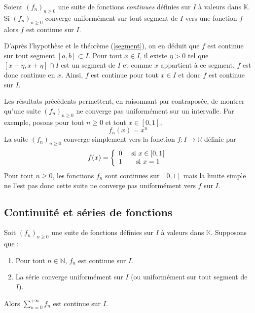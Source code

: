 \documentclass[a4paper,10pt]{report}
\begin{document}
\begin{Proposition}{} Soient $(f_n)_{n \geq 0}$ une suite de fonctions \emph{continues} définies sur $I$ à valeurs dans $\mathbb{K}$. Si $(f_n)_{n \geq 0}$ converge uniformément sur tout segment de $I$ vers une fonction $f$ alors $f$ est continue sur $I$.
\end{Proposition}

\begin{Demonstration}{} D'après l'hypothèse et le théorème (\ref{segment}), on en déduit que $f$ est continue sur tout segment $[a,b] \subset I$. Pour tout $x \in I$, il existe $\eta>0$ tel que $[x- \eta, x+ \eta] \cap I$ est un segment de $I$ et comme $x$ appartient à ce segment, $f$ est donc continue en $x$. Ainsi, $f$ est continue pour tout $x \in I$ et donc $f$ est continue sur $I$.
\end{Demonstration}

\medskip



\begin{Remarque}{} Les résultats précédents permettent, en raisonnant par contraposée, de montrer qu'une suite $(f_n)_{n \geq 0}$ ne converge pas uniformément sur un intervalle. Par exemple, posons pour tout $n \geq 0$ et tout $x \in [0,1]$,
$$ f_n(x) = x^n $$
La suite $(f_n)_{n \geq 0}$ converge simplement vers la fonction $f : I \rightarrow \mathbb{R}$ définie par 
$$  f(x) = \left\lbrace \begin{array}{ccl}
0 & \hbox{ si } x \in [0,1[ \\
1 & \hbox{ si } x =1 \\
\end{array}\right. $$
Pour tout $n \geq 0$, les fonctions $f_n$ sont continues sur $[0,1]$ mais la limite simple ne l'est pas donc cette suite ne converge pas uniformément vers $f$ sur $I$.
\end{Remarque}

\subsection{Continuité et séries de fonctions}

\begin{Theoreme}{} Soit $(f_n)_{n \geq 0}$ une suite de fonctions définies sur $I$ à valeurs dans $\mathbb{K}$. Supposons que :

\begin{enumerate}
\item Pour tout $n \in \mathbb{N}$, $f_n$ est continue sur $I$.
\item La série converge uniformément sur $I$ (ou uniformément sur tout segment de $I$).
\end{enumerate}
Alors $\sum_{n  =0}^{+ \infty} f_n$ est continue sur $I$.
\end{Theoreme}
\end{document}
